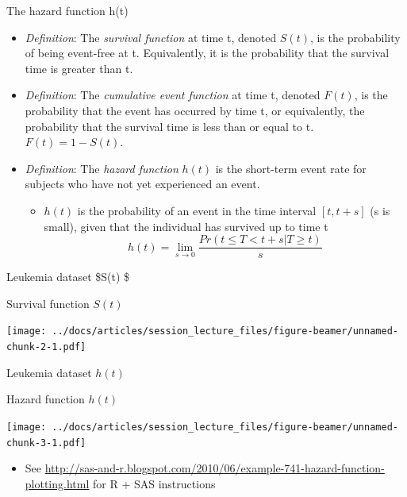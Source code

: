 \documentclass[
  ignorenonframetext,
]{beamer}
\providecommand{\tightlist}{%
  \setlength{\itemsep}{0pt}\setlength{\parskip}{0pt}}
\begin{document}
\begin{frame}{The hazard function h(t)}
\protect\hypertarget{the-hazard-function-ht}{}

\begin{itemize}
\item
  \emph{Definition}: The \emph{survival function} at time t, denoted
  \(S(t)\), is the probability of being event-free at t. Equivalently,
  it is the probability that the survival time is greater than t.
\item
  \emph{Definition}: The \emph{cumulative event function} at time t,
  denoted \(F(t)\), is the probability that the event has occurred by
  time t, or equivalently, the probability that the survival time is
  less than or equal to t. \(F(t) = 1-S(t)\).
\item
  \emph{Definition}: The \emph{hazard function} \(h(t)\) is the
  short-term event rate for subjects who have not yet experienced an
  event.

  \begin{itemize}
  \tightlist
  \item
    \(h(t)\) is the probability of an event in the time interval
    \([t, t+s]\) (s is small), given that the individual has survived up
    to time t
    \[h(t) = \lim_{s \to 0} \frac{Pr(t \leq T < t+s | T \ge t)}{s}\]
  \end{itemize}
\end{itemize}

\end{frame}

\begin{frame}{Leukemia dataset \$S(t) \$}
\protect\hypertarget{leukemia-dataset-st}{}

Survival function \(S(t)\)

\texttt{[image: ../docs/articles/session\_lecture\_files/figure-beamer/unnamed-chunk-2-1.pdf]}

\end{frame}

\begin{frame}{Leukemia dataset \(h(t)\)}
\protect\hypertarget{leukemia-dataset-ht}{}

Hazard function \(h(t)\)

\texttt{[image: ../docs/articles/session\_lecture\_files/figure-beamer/unnamed-chunk-3-1.pdf]}

\footnotesize

\begin{itemize}
\tightlist
\item
  See
  \url{http://sas-and-r.blogspot.com/2010/06/example-741-hazard-function-plotting.html}
  for R + SAS instructions
\end{itemize}

\end{frame}
\end{document}

